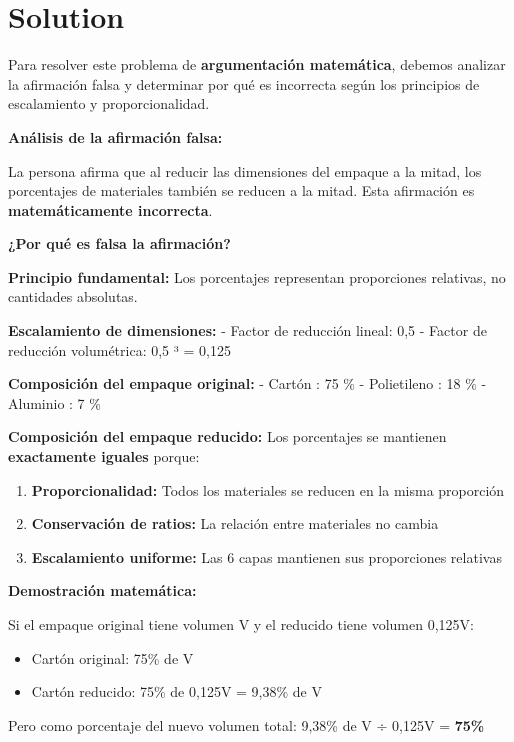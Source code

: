 \documentclass[
]{article}
\providecommand{\tightlist}{%
  \setlength{\itemsep}{0pt}\setlength{\parskip}{0pt}}
\begin{document}
\section{Solution}\label{solution}

Para resolver este problema de \textbf{argumentación matemática},
debemos analizar la afirmación falsa y determinar por qué es incorrecta
según los principios de escalamiento y proporcionalidad.

\textbf{Análisis de la afirmación falsa:}

La persona afirma que al reducir las dimensiones del empaque a la mitad,
los porcentajes de materiales también se reducen a la mitad. Esta
afirmación es \textbf{matemáticamente incorrecta}.

\textbf{¿Por qué es falsa la afirmación?}

\textbf{Principio fundamental:} Los porcentajes representan proporciones
relativas, no cantidades absolutas.

\textbf{Escalamiento de dimensiones:} - Factor de reducción lineal: 0,5
- Factor de reducción volumétrica: 0,5 ³ = 0,125

\textbf{Composición del empaque original:} - Cartón : 75 \% -
Polietileno : 18 \% - Aluminio : 7 \%

\textbf{Composición del empaque reducido:} Los porcentajes se mantienen
\textbf{exactamente iguales} porque:

\begin{enumerate}
\def\labelenumi{\arabic{enumi}.}
\tightlist
\item
  \textbf{Proporcionalidad:} Todos los materiales se reducen en la misma
  proporción
\item
  \textbf{Conservación de ratios:} La relación entre materiales no
  cambia
\item
  \textbf{Escalamiento uniforme:} Las 6 capas mantienen sus proporciones
  relativas
\end{enumerate}

\textbf{Demostración matemática:}

Si el empaque original tiene volumen V y el reducido tiene volumen
0,125V:

\begin{itemize}
\tightlist
\item
  Cartón original: 75\% de V
\item
  Cartón reducido: 75\% de 0,125V = 9,38\% de V
\end{itemize}

Pero como porcentaje del nuevo volumen total: 9,38\% de V ÷ 0,125V =
\textbf{75\%}
\end{document}
